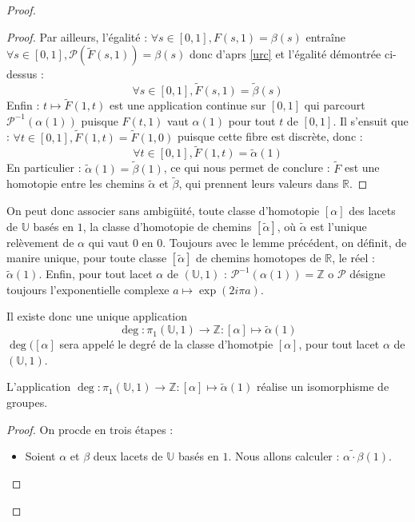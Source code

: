 \begin{proof}
\begin{proof}
Par ailleurs, l'\'egalit\'e : $\forall s\in[0,1],F(s,1)=\beta (s)$ entra\^ine $\forall s\in[0,1], \mathcal{P}(\tilde{F}(s,1))=\beta (s)$ donc d'aprs \ref{urc} et l'\'egalit\'e d\'emontr\'ee ci-dessus :
\[\forall s\in[0,1], \tilde{F}(s,1)=\tilde{\beta}(s)\]
Enfin : $t\mapsto\tilde{F}(1,t)$ est une application continue sur $[0,1]$ qui parcourt $\mathcal{P}^{-1}(\alpha (1))$ puisque $F(t,1)$ vaut $\alpha (1)$ pour tout $t$ de $[0,1]$. %
Il s'ensuit que : $\forall t\in[0,1] , \tilde{F}(1,t)=\tilde{F}(1,0)$ puisque cette fibre est discr\`ete, donc :
\[\forall t\in[0,1],\tilde{F}(1,t)=\tilde{\alpha}(1)\]
En particulier : $\tilde{\alpha}(1)=\tilde{\beta}(1)$, ce qui nous permet de conclure : $\tilde{F}$ est une homotopie entre les chemins $\tilde{\alpha}$ et $\tilde{\beta}$, qui prennent leurs valeurs dans $\mathbb{R}$.
\end{proof}

On peut donc associer sans ambig\"uit\'e,  toute classe d'homotopie $[\alpha]$ des lacets de $\mathbb{U}$ bas\'es en $1$, %
la classe d'homotopie de chemins $[\tilde{\alpha}]$, o\`u $\tilde{\alpha}$ est l'unique rel\`evement de $\alpha$ qui vaut $0$ en $0$. %
Toujours avec le lemme pr\'ec\'edent, on d\'efinit, de manire unique, pour toute classe $[\tilde{\alpha}]$ de chemins homotopes de $\mathbb{R}$, le r\'eel : $\tilde{\alpha}(1)$. %
Enfin, pour tout lacet $\alpha$ de $(\mathbb{U},1)$ : %
$\mathcal{P}^{-1}(\alpha (1))=\mathbb{Z}$ o $\mathcal{P}$ d\'esigne toujours l'exponentielle complexe $a\mapsto\exp (2i\pi a)$.

Il existe donc une unique application
\[\deg :\pi_1(\mathbb{U},1)\rightarrow \mathbb{Z}:[\alpha]\mapsto \tilde{\alpha}(1)\]
$\deg ([\alpha]$ sera appel\'e le degr\'e de la classe d'homotpie $[\alpha]$, pour tout lacet $\alpha$ de $(\mathbb{U},1)$.

\begin{lemm}\label{isodeg}
L'application $\deg :\pi_1(\mathbb{U},1)\rightarrow\mathbb{Z}:[\alpha]\mapsto\tilde{\alpha}(1)$ r\'ealise un isomorphisme de groupes.
\end{lemm}

\begin{proof}
On procde en trois \'etapes :
\begin{itemize}
\item[\textit{Propri\'et\'e de morphisme :}]
Soient $\alpha$ et $\beta$ deux lacets de $\mathbb{U}$ bas\'es en $1$. Nous allons calculer : $\tilde{\alpha\cdot\beta} (1)$.


\end{itemize}
\end{proof}
\end{proof}
